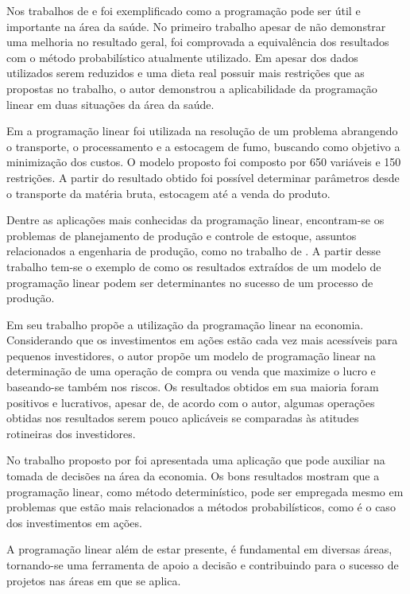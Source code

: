 Nos trabalhos de  e  foi exemplificado como a programação pode ser útil e importante na área da saúde. No primeiro trabalho apesar de não demonstrar uma melhoria no resultado geral, foi comprovada a equivalência dos resultados com o método probabilístico atualmente utilizado. Em  apesar dos dados utilizados serem reduzidos e uma dieta real possuir mais restrições que as propostas no trabalho, o autor demonstrou a aplicabilidade da programação linear em duas situações da área da saúde.

Em  a programação linear foi utilizada na resolução de um problema abrangendo o transporte, o processamento e a estocagem de fumo, buscando como objetivo a minimização dos custos. O modelo proposto foi composto por 650 variáveis e 150 restrições. A partir do resultado obtido foi possível determinar parâmetros desde o transporte da matéria bruta, estocagem até a venda do produto.

Dentre as aplicações mais conhecidas da programação linear, encontram-se os problemas de planejamento de produção e controle de estoque, assuntos relacionados a engenharia de produção, como no trabalho de . A partir desse trabalho tem-se o exemplo de como os resultados extraídos de um modelo de programação linear podem ser determinantes no sucesso de um processo de produção.

Em seu trabalho  propõe a utilização da programação linear na economia. Considerando que os investimentos em ações estão cada vez mais acessíveis para pequenos investidores, o autor propõe um modelo de programação linear na determinação de uma operação de compra ou venda que maximize o lucro e baseando-se também nos riscos. Os resultados obtidos em sua maioria foram positivos e lucrativos, apesar de, de acordo com o autor, algumas operações obtidas nos resultados serem pouco aplicáveis se comparadas às atitudes rotineiras dos investidores.

No trabalho proposto por \cite{Krukoski2010Economia} foi apresentada uma aplicação que pode auxiliar na tomada de decisões na área da economia. Os bons resultados mostram que a programação linear, como método determinístico, pode ser empregada mesmo em problemas que estão mais relacionados a métodos probabilísticos, como é o caso dos investimentos em ações.

A programação linear além de estar presente, é fundamental em diversas áreas, tornando-se uma ferramenta de apoio a decisão e contribuindo para o sucesso de projetos nas áreas em que se aplica.

